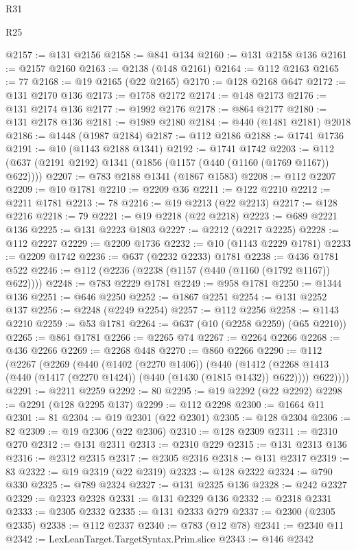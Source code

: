 \begin{lexlean}{R31}
\begin{lexlean}{R25}
\begin{coremodule}
{{{{{{{{{{{{{{{{{{{{{{{{{{{{{{{{{{{{{{{{{{{{{{{{{{{{{{{{{{{{{{{{{{{{{{{{{{{{{{{{{{{{{{{{{{{{{{{{{{{{{{{{{{{{{{{{{{{{{{{{{{{{{{{{{{{{{{{{{{{{{{{{{{{{{{{{{{{{{{{{{{{{{{{{{{{{{{{{{{{{{{{{{{{{{{{{{{{{{{{@2157 := @131 @2156
@2158 := @841 @134
@2160 := @131 @2158 @136
@2161 := @2157 @2160
@2163 := @2138 (@148 @2161)
@2164 := @112 @2163
@2165 := 77
@2168 := @19 @2165 (@22 @2165)
@2170 := @128 @2168 @647
@2172 := @131 @2170 @136
@2173 := @1758 @2172
@2174 := @148 @2173
@2176 := @131 @2174 @136
@2177 := @1992 @2176
@2178 := @864 @2177
@2180 := @131 @2178 @136
@2181 := @1989 @2180
@2184 := @440 (@1481 @2181) @2018
@2186 := @1448 (@1987 @2184)
@2187 := @112 @2186
@2188 := @1741 @1736
@2191 := @10 (@1143 @2188 @1341)
@2192 := @1741 @1742
@2203 := @112 (@637 (@2191 @2192) @1341 (@1856 (@1157 (@440 (@1160 (@1769 @1167)) @622))))
@2207 := @783 @2188 @1341 (@1867 @1583)
@2208 := @112 @2207
@2209 := @10 @1781
@2210 := @2209 @36
@2211 := @122 @2210
@2212 := @2211 @1781
@2213 := 78
@2216 := @19 @2213 (@22 @2213)
@2217 := @128 @2216
@2218 := 79
@2221 := @19 @2218 (@22 @2218)
@2223 := @689 @2221 @136
@2225 := @131 @2223 @1803
@2227 := @2212 (@2217 @2225)
@2228 := @112 @2227
@2229 := @2209 @1736
@2232 := @10 (@1143 @2229 @1781)
@2233 := @2209 @1742
@2236 := @637 (@2232 @2233) @1781
@2238 := @436 @1781 @522
@2246 := @112 (@2236 (@2238 (@1157 (@440 (@1160 (@1792 @1167)) @622))))
@2248 := @783 @2229 @1781
@2249 := @958 @1781
@2250 := @1344 @136
@2251 := @646 @2250
@2252 := @1867 @2251
@2254 := @131 @2252 @137
@2256 := @2248 (@2249 @2254)
@2257 := @112 @2256
@2258 := @1143 @2210
@2259 := @53 @1781
@2264 := @637 (@10 (@2258 @2259) (@65 @2210))
@2265 := @861 @1781
@2266 := @2265 @74
@2267 := @2264 @2266
@2268 := @436 @2266
@2269 := @2268 @448
@2270 := @860 @2266
@2290 := @112
    (@2267
      (@2269
        (@440
          (@1402 (@2270 @1406))
          (@440
            (@1412 (@2268 @1413 (@440 (@1417 (@2270 @1424)) (@440 (@1430 (@1815 @1432)) @622))))
            @622))))
@2291 := @2211 @2259
@2292 := 80
@2295 := @19 @2292 (@22 @2292)
@2298 := @2291 (@128 @2295 @137)
@2299 := @112 @2298
@2300 := @1664 @11
@2301 := 81
@2304 := @19 @2301 (@22 @2301)
@2305 := @128 @2304
@2306 := 82
@2309 := @19 @2306 (@22 @2306)
@2310 := @128 @2309
@2311 := @2310 @270
@2312 := @131 @2311
@2313 := @2310 @229
@2315 := @131 @2313 @136
@2316 := @2312 @2315
@2317 := @2305 @2316
@2318 := @131 @2317
@2319 := 83
@2322 := @19 @2319 (@22 @2319)
@2323 := @128 @2322
@2324 := @790 @330
@2325 := @789 @2324
@2327 := @131 @2325 @136
@2328 := @242 @2327
@2329 := @2323 @2328
@2331 := @131 @2329 @136
@2332 := @2318 @2331
@2333 := @2305 @2332
@2335 := @131 @2333 @279
@2337 := @2300 (@2305 @2335)
@2338 := @112 @2337
@2340 := @783 (@12 @78)
@2341 := @2340 @11
@2342 := LexLeanTarget.TargetSyntax.Prim.slice
@2343 := @146 @2342
}}}}}}}}}}}}}}}}}}}}}}}}}}}}}}}}}}}}}}}}}}}}}}}}}}}}}}}}}}}}}}}}}}}}}}}}}}}}}}}}}}}}}}}}}}}}}}}}}}}}}}}}}}}}}}}}}}}}}}}}}}}}}}}}}}}}}}}}}}}}}}}}}}}}}}}}}}}}}}}}}}}}}}}}}}}}}}}}}}}}}}}}}}}}}}}}}}}}}}}
\end{coremodule}
\end{lexlean}
\end{lexlean}
